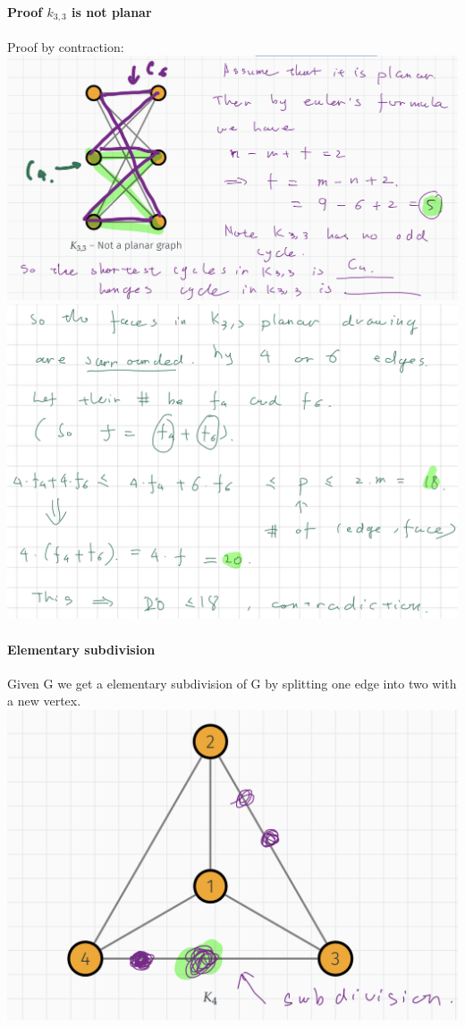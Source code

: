 \documentclass{article}
\begin{document}
\paragraph{Proof $k_{3,3}$ is not planar} Proof by contraction:\\
\includegraphics{0105}\\
\includegraphics{0106}
\paragraph{Elementary subdivision}
Given G we get a elementary subdivision of G by splitting one edge into two with a new vertex.\\
\includegraphics{0107}
\end{document}
